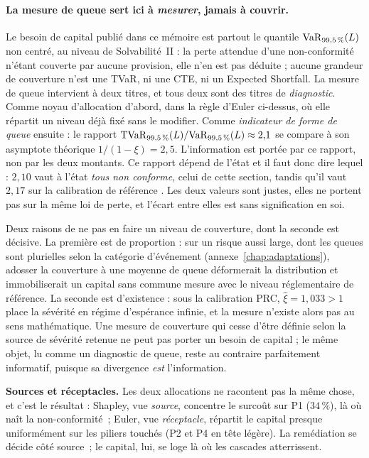 \paragraph{La mesure de queue sert ici à \emph{mesurer}, jamais à couvrir.} Le besoin de capital
publié dans ce mémoire est partout le quantile $\mathrm{VaR}_{99{,}5\,\%}(L)$ non centré, au niveau de
Solvabilité~II : la perte attendue d'une non-conformité n'étant couverte par aucune provision,
elle n'en est pas déduite ; aucune
grandeur de couverture n'est une TVaR, ni une CTE, ni un Expected Shortfall. La mesure
de queue intervient à deux titres, et tous deux sont des titres de \emph{diagnostic}. Comme
noyau d'allocation d'abord, dans la règle d'Euler ci-dessus, où elle répartit un niveau déjà
fixé sans le modifier. Comme \emph{indicateur de forme de queue} ensuite : le rapport
$\mathrm{TVaR}_{99{,}5\,\%}(L)/\mathrm{VaR}_{99{,}5\,\%}(L) \approx 2{,}1$ se compare à son asymptote théorique
$1/(1-\xi) = 2{,}5$. L'information est portée par ce rapport, non par les deux montants.
Ce rapport dépend de l'état et il faut
donc dire lequel : $2{,}10$ vaut à l'état \emph{tous non conforme}, celui de cette section, tandis
qu'il vaut $2{,}17$ sur la calibration de référence \matcomp. Les deux
valeurs sont justes, elles ne portent pas sur la même loi de perte, et l'écart entre elles est
sans signification en soi.

Deux raisons de ne pas en faire un niveau de couverture, dont la seconde est décisive. La
première est de proportion : sur un risque aussi large, dont les queues sont plurielles selon la
catégorie d'événement (annexe~\ref{chap:adaptations}), adosser la couverture à une moyenne de queue
déformerait la distribution et immobiliserait un capital sans commune mesure avec le niveau
réglementaire de référence. La seconde est d'existence : sous la calibration PRC,
$\hat\xi=1{,}033>1$ place la sévérité en régime d'espérance infinie, et la mesure
n'existe alors pas au sens mathématique. Une mesure de couverture qui cesse d'être définie
selon la source de sévérité retenue ne peut pas porter un besoin de capital ; le même objet,
lu comme un diagnostic de queue, reste au contraire parfaitement informatif, puisque sa
divergence \emph{est} l'information.

\begin{cle}
\textbf{Sources et réceptacles.} Les deux allocations ne racontent pas la même chose, et
c'est le résultat : Shapley, vue \emph{source}, concentre le surcoût sur P1 ($34\,\%$), là
où naît la non-conformité~; Euler, vue \emph{réceptacle}, répartit le capital presque
uniformément sur les piliers touchés (P2 et P4 en tête légère). La remédiation se décide
côté source~; le capital, lui, se loge là où les cascades atterrissent.
\end{cle}

